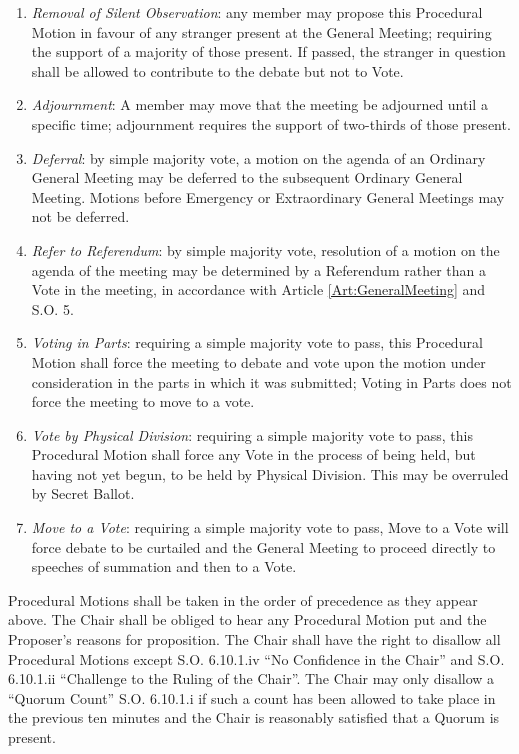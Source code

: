 \begin{enumerate}
\item \textit{Removal of Silent Observation}: any member may propose this Procedural Motion in favour of any stranger present at the General Meeting; requiring the support of a majority of those present. If passed, the stranger in question shall be allowed to contribute to the debate but not to Vote.
\item \textit{Adjournment}: A member may move that the meeting be adjourned until a specific time; adjournment requires the support of two-thirds of those present.
\item \textit{Deferral}: by simple majority vote, a motion on the agenda of an Ordinary General Meeting may be deferred to the subsequent Ordinary General Meeting. Motions before Emergency or Extraordinary General Meetings may not be deferred.
\item \textit{Refer to Referendum}: by simple majority vote, resolution of a motion on the agenda of the meeting may be determined by a Referendum rather than a Vote in the meeting, in accordance with Article \ref{Art:GeneralMeeting} and S.O. 5.
\item \textit{Voting in Parts}: requiring a simple majority vote to pass, this Procedural Motion shall force the meeting to debate and vote upon the motion under consideration in the parts in which it was submitted; Voting in Parts does not force the meeting to move to a vote.
\item \textit{Vote by Physical Division}: requiring a simple majority vote to pass, this Procedural Motion shall force any Vote in the process of being held, but having not yet begun, to be held by Physical Division.  This may be overruled by Secret Ballot.
\item \textit{Move to a Vote}: requiring a simple majority vote to pass, Move to a Vote will force debate to be curtailed and the General Meeting to proceed directly to speeches of summation and then to a Vote.
\end{enumerate}
\npara Procedural Motions shall be taken in the order of precedence as they appear above.
\npara The Chair shall be obliged to hear any Procedural Motion put and the Proposer's reasons for proposition.
\npara The Chair shall have the right to disallow all Procedural Motions except S.O. 6.10.1.iv ``No Confidence in the Chair'' and S.O. 6.10.1.ii ``Challenge to the Ruling of the Chair''. The Chair may only disallow a ``Quorum Count'' S.O. 6.10.1.i if such a count has been allowed to take place in the previous ten minutes and the Chair is reasonably satisfied that a Quorum is present.
